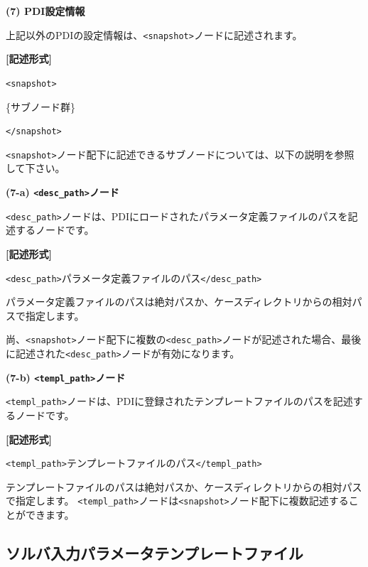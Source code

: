 \documentclass[a4paper,11pt]{jarticle}
\begin{document}
{\vspace{12pt}
\textbf{(7) PDI設定情報}

上記以外のPDIの設定情報は、\texttt{<snapshot>}ノードに記述されます。

\vspace{8pt}
\leftskip=12pt
\textbf{[記述形式]}

\leftskip=42pt
\texttt{<snapshot>}    

\parindent=14pt
\{サブノード群\}

\parindent=0pt
\texttt{</snapshot>}

\vspace{8pt}
\leftskip=0pt
\texttt{<snapshot>}ノード配下に記述できるサブノードについては、以下の説明を参照して下さい。

\vspace{12pt}
\textbf{(7-a) \texttt{<desc\_path>}ノード}

\texttt{<desc\_path>}ノードは、PDIにロードされたパラメータ定義ファイルのパスを記述するノードです。

\vspace{8pt}
\leftskip=12pt
\textbf{[記述形式]}

\leftskip=42pt
\texttt{<desc\_path>}パラメータ定義ファイルのパス\texttt{</desc\_path>}

\vspace{8pt}
\leftskip=0pt
パラメータ定義ファイルのパスは絶対パスか、ケースディレクトリからの相対パスで指定します。

尚、\texttt{<snapshot>}ノード配下に複数の\texttt{<desc\_path>}ノードが記述された場合、最後に記述された\texttt{<desc\_path>}ノードが有効になります。

\vspace{12pt}
\textbf{(7-b) \texttt{<templ\_path>}ノード}

\texttt{<templ\_path>}ノードは、PDIに登録されたテンプレートファイルのパスを記述するノードです。

\vspace{8pt}
\leftskip=12pt
\textbf{[記述形式]}

\leftskip=42pt
\texttt{<templ\_path>}テンプレートファイルのパス\texttt{</templ\_path>}

\vspace{8pt}
\leftskip=0pt
テンプレートファイルのパスは絶対パスか、ケースディレクトリからの相対パスで指定します。
\texttt{<templ\_path>}ノードは\texttt{<snapshot>}ノード配下に複数記述することができます。

\newpage
\subsection{ソルバ入力パラメータテンプレートファイル}

}
\end{document}
